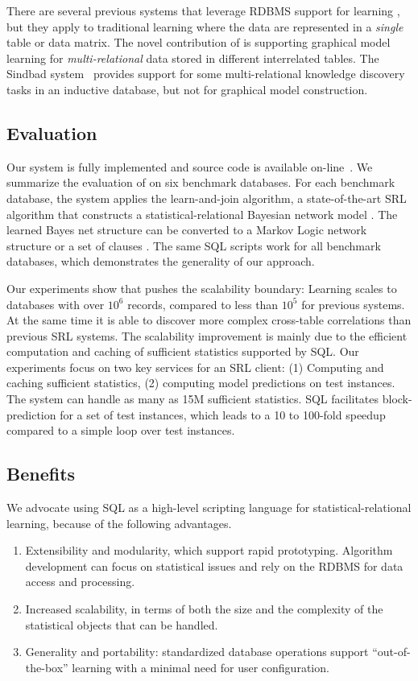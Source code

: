 \documentclass{article} %
\begin{document}
There are several previous systems that leverage RDBMS support for learning \cite{MADlib_VLDB_2012,MLbase_ICDR_2013}, but they apply to traditional learning where the  data are represented in a {\em single} table or data matrix. The novel contribution of \FB is supporting graphical model learning for {\em multi-relational} data stored in different interrelated tables. The Sindbad system~\cite{Wicker2010} provides support for some multi-relational knowledge discovery tasks in an inductive database, but not for graphical model construction. 



\subsection{Evaluation} Our system is fully implemented and source code is available  on-line~\cite{bib:bbsite}. We summarize the evaluation of \FB on six benchmark databases. For each benchmark database, the system applies the learn-and-join algorithm, a state-of-the-art SRL algorithm that constructs a  statistical-relational Bayesian network model \cite{Schulte2012}. The learned Bayes net structure can be converted to a Markov Logic network structure or a set of clauses \cite{Khosravi2010}.
The same SQL scripts work for all benchmark databases, which demonstrates the generality of our approach.  

Our experiments show that \FB pushes the scalability boundary: Learning scales to databases with over $10^6$ records, compared to less than $10^5$ for previous systems. At the same time it is able to discover more complex cross-table correlations than previous SRL systems. The scalability improvement is mainly due to the efficient computation and caching of sufficient statistics supported by SQL. Our experiments focus on two key services  for an SRL client: (1) Computing and caching sufficient statistics, (2) computing model predictions on test instances. The system can handle as many as 15M sufficient statistics. 
SQL facilitates block-prediction for a set of test instances, which leads to a 10 to 100-fold speedup compared to a simple loop over test instances.
\subsection{Benefits}
We advocate using SQL as a high-level scripting language for statistical-relational learning, because of the following advantages.
\begin{enumerate}
\item Extensibility and modularity, which support rapid prototyping. Algorithm development can focus on statistical issues and rely on the RDBMS for data access and processing.
\item Increased scalability, in terms of both the size and the complexity of the statistical objects that can be handled.
\item Generality and portability: standardized database operations support ``out-of-the-box'' learning with a minimal need for user configuration.
\end{enumerate}
\end{document}

